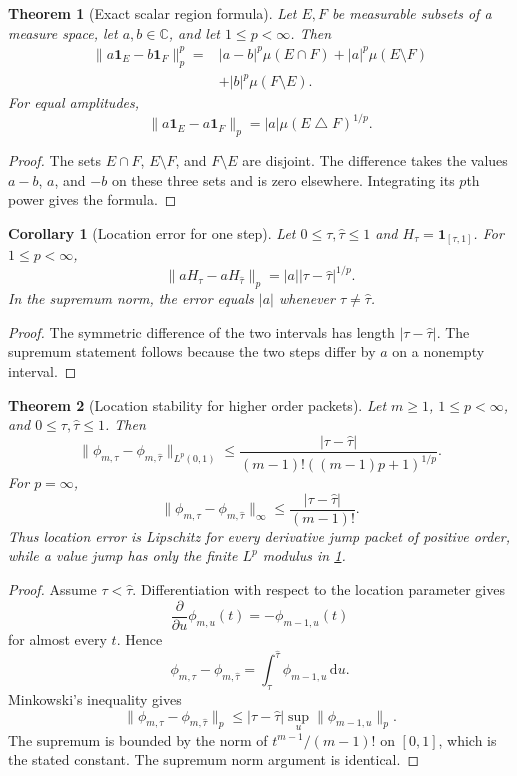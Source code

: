 \documentclass{aomart}
\newtheorem{theorem}{Theorem}[section]
\newtheorem{corollary}[corollary]{Corollary}
\theoremstyle{definition}
\theoremstyle{remark}
\newcommand{\CC}{\mathbb C}
\newcommand{\one}{\mathbf 1}
\newcommand{\dd}{\,\mathrm d}
\begin{document}
\begin{theorem}[Exact scalar region formula]\label{thm:scalar_region_formula}
Let \(E,F\) be measurable subsets of a measure space, let \(a,b\in\CC\), and let \(1\leq p<\infty\). Then
\[
\begin{aligned}
\|a\one_E-b\one_F\|_p^p
={}&
|a-b|^p\mu(E\cap F)
+|a|^p\mu(E\setminus F)\\
&+|b|^p\mu(F\setminus E).
\end{aligned}
\]
For equal amplitudes,
\[
\|a\one_E-a\one_F\|_p
=
|a|\mu(E\mathbin\triangle F)^{1/p}.
\]
\end{theorem}

\begin{proof}
The sets \(E\cap F\), \(E\setminus F\), and \(F\setminus E\) are disjoint. The difference takes the values \(a-b\), \(a\), and \(-b\) on these three sets and is zero elsewhere. Integrating its \(p\)th power gives the formula.
\end{proof}

\begin{corollary}[Location error for one step]\label{cor:step_location_error}
Let \(0\leq\tau,\widehat\tau\leq1\) and \(H_\tau=\one_{[\tau,1]}\). For \(1\leq p<\infty\),
\[
\|aH_\tau-aH_{\widehat\tau}\|_p
=
|a||\tau-\widehat\tau|^{1/p}.
\]
In the supremum norm, the error equals \(|a|\) whenever \(\tau\neq\widehat\tau\).
\end{corollary}

\begin{proof}
The symmetric difference of the two intervals has length \(|\tau-\widehat\tau|\). The supremum statement follows because the two steps differ by \(a\) on a nonempty interval.
\end{proof}

\begin{theorem}[Location stability for higher order packets]\label{thm:higher_order_location}
Let \(m\geq1\), \(1\leq p<\infty\), and \(0\leq\tau,\widehat\tau\leq1\). Then
\[
\|\phi_{m,\tau}-\phi_{m,\widehat\tau}\|_{L^p(0,1)}
\leq
\frac{|\tau-\widehat\tau|}
{(m-1)!((m-1)p+1)^{1/p}}.
\]
For \(p=\infty\),
\[
\|\phi_{m,\tau}-\phi_{m,\widehat\tau}\|_\infty
\leq
\frac{|\tau-\widehat\tau|}{(m-1)!}.
\]
Thus location error is Lipschitz for every derivative jump packet of positive order, while a value jump has only the finite \(L^p\) modulus in \cref{cor:step_location_error}.
\end{theorem}

\begin{proof}
Assume \(\tau<\widehat\tau\). Differentiation with respect to the location parameter gives
\[
\frac{\partial}{\partial u}\phi_{m,u}(t)
=-\phi_{m-1,u}(t)
\]
for almost every \(t\). Hence
\[
\phi_{m,\tau}-\phi_{m,\widehat\tau}
=
\int_\tau^{\widehat\tau}\phi_{m-1,u}\dd u.
\]
Minkowski's inequality gives
\[
\|\phi_{m,\tau}-\phi_{m,\widehat\tau}\|_p
\leq
|\tau-\widehat\tau|
\sup_u\|\phi_{m-1,u}\|_p.
\]
The supremum is bounded by the norm of \(t^{m-1}/(m-1)!\) on \([0,1]\), which is the stated constant. The supremum norm argument is identical.
\end{proof}
\end{document}
